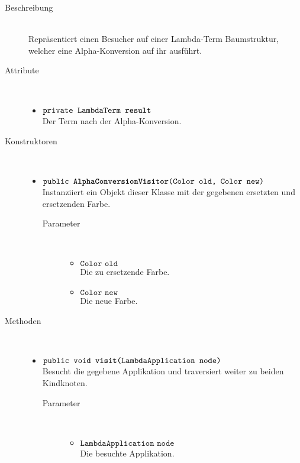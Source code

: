 \begin{description}
\item[Beschreibung] \hfill \\ Repräsentiert einen Besucher auf einer Lambda-Term Baumstruktur, welcher eine Alpha-Konversion auf ihr ausführt.

\item[Attribute] \hfill \\
	\vspace{-.8cm}
	\begin{itemize}
		\item $\texttt{private LambdaTerm \textbf{result}}$ \\ Der Term nach der Alpha-Konversion.
	\end{itemize}

\item[Konstruktoren] \hfill \\
	\vspace{-.8cm}
	\begin{itemize}
		\item $\texttt{public \textbf{AlphaConversionVisitor}(Color old, Color new)}$ \\ Instanziiert ein Objekt dieser Klasse mit der gegebenen ersetzten und ersetzenden Farbe.
		\begin{description}
			\item[Parameter] \hfill \\
			\vspace{-.8cm}
			\begin{itemize}
				\item $\texttt{Color old}$ \\ Die zu ersetzende Farbe.
				\item $\texttt{Color new}$ \\ Die neue Farbe.
			\end{itemize}
		\end{description}
	\end{itemize}

\item[Methoden] \hfill \\
	\vspace{-.8cm}
	\begin{itemize}
		\item $\texttt{public void \textbf{visit}(LambdaApplication node)}$ \\ Besucht die gegebene Applikation und traversiert weiter zu beiden Kindknoten.
		\begin{description}
			\item[Parameter] \hfill \\
			\vspace{-.8cm}
			\begin{itemize}
				\item $\texttt{LambdaApplication node}$ \\ Die besuchte Applikation.
			\end{itemize}
		\end{description}
		

\end{itemize}
\end{description}
